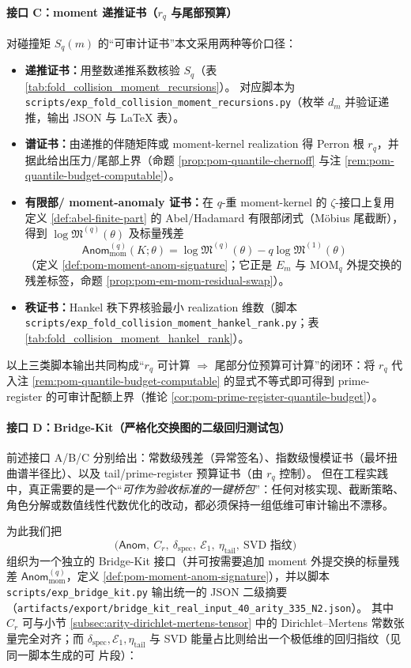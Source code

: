 \paragraph{接口 C：moment 递推证书（\texorpdfstring{$r_q$}{rq} 与尾部预算）}
对碰撞矩 \(S_q(m)\) 的“可审计证书”本文采用两种等价口径：
\begin{itemize}
  \item \textbf{递推证书：}用整数递推系数核验 \(S_q\)（表 \ref{tab:fold_collision_moment_recursions}）。
  对应脚本为 \texttt{scripts/exp\_fold\_collision\_moment\_recursions.py}（枚举 \(d_m\) 并验证递推，输出 JSON 与 LaTeX 表）。
  \item \textbf{谱证书：}由递推的伴随矩阵或 moment-kernel realization 得 Perron 根 \(r_q\)，并据此给出压力/尾部上界（命题 \ref{prop:pom-quantile-chernoff} 与注 \ref{rem:pom-quantile-budget-computable}）。
  \item \textbf{有限部/ moment-anomaly 证书：}在 \(q\)-重 moment-kernel 的 \(\zeta\)-接口上复用定义 \ref{def:abel-finite-part} 的 Abel/Hadamard 有限部闭式（Möbius 尾截断），得到 \(\log\mathfrak{M}^{(q)}(\theta)\) 及标量残差
  \[
  \mathsf{Anom}^{(q)}_{\mathrm{mom}}(K;\theta)=\log\mathfrak{M}^{(q)}(\theta)-q\log\mathfrak{M}^{(1)}(\theta)
  \]
  （定义 \ref{def:pom-moment-anom-signature}；它正是 \(E_m\) 与 \(\mathrm{MOM}_q\) 外提交换的残差标签，命题 \ref{prop:pom-em-mom-residual-swap}）。
  \item \textbf{秩证书：}Hankel 秩下界核验最小 realization 维数（脚本 \texttt{scripts/exp\_fold\_collision\_moment\_hankel\_rank.py}；表 \ref{tab:fold_collision_moment_hankel_rank}）。
  \end{itemize}

以上三类脚本输出共同构成“\(r_q\) 可计算 \(\Rightarrow\) 尾部分位预算可计算”的闭环：将 \(r_q\) 代入注 \ref{rem:pom-quantile-budget-computable} 的显式不等式即可得到 prime-register 的可审计配额上界（推论 \ref{cor:pom-prime-register-quantile-budget}）。

\paragraph{接口 D：Bridge-Kit（严格化交换图的二级回归测试包）}
前述接口 A/B/C 分别给出：常数级残差（异常签名）、指数级慢模证书（最坏扭曲谱半径比）、以及 tail/prime-register 预算证书（由 \(r_q\) 控制）。
但在工程实践中，真正需要的是一个“\emph{可作为验收标准的一键桥包}”：任何对核实现、截断策略、角色分解或数值线性代数优化的改动，都必须保持一组低维可审计输出不漂移。
\par
为此我们把
\[
\bigl(\mathsf{Anom},\ C_r,\ \delta_{\mathrm{spec}},\ \mathcal{E}_1,\ \eta_{\mathrm{tail}},\ \text{SVD 指纹}\bigr)
\]
组织为一个独立的 Bridge-Kit 接口（并可按需要追加 moment 外提交换的标量残差 \(\mathsf{Anom}^{(q)}_{\mathrm{mom}}\)，定义 \ref{def:pom-moment-anom-signature}），并以脚本
\texttt{scripts/exp\_bridge\_kit.py}
输出统一的 JSON 二级摘要（\texttt{artifacts/export/bridge\_kit\_real\_input\_40\_arity\_335\_N2.json}）。
其中 \(C_r\) 可与小节 \ref{subsec:arity-dirichlet-mertens-tensor} 中的 Dirichlet--Mertens 常数张量完全对齐；而 \(\delta_{\mathrm{spec}},\mathcal{E}_1,\eta_{\mathrm{tail}}\) 与 SVD 能量占比则给出一个极低维的回归指纹（见同一脚本生成的可 \verb|| 片段）：


